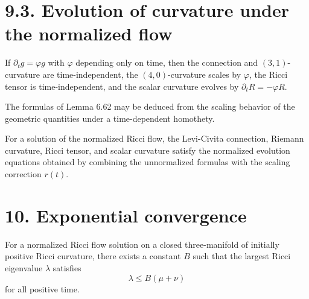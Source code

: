 \section*{9.3. Evolution of curvature under the normalized flow}

\begin{lemma}
\label{ch06-lem-pure-scaling-evolution}
If \(\partial_t g=\varphi g\) with \(\varphi\) depending only on time, then the connection and \((3,1)\)-curvature are time-independent, the \((4,0)\)-curvature scales by \(\varphi\), the Ricci tensor is time-independent, and the scalar curvature evolves by \(\partial_t R=-\varphi R\).
\end{lemma}

\begin{remark}
\label{ch06-rem-scaling-interpretation}
The formulas of Lemma 6.62 may be deduced from the scaling behavior of the geometric quantities under a time-dependent homothety.
\end{remark}

\begin{corollary}
\label{ch06-cor-curvature-evolution-normalized-flow}
For a solution of the normalized Ricci flow, the Levi-Civita connection, Riemann curvature, Ricci tensor, and scalar curvature satisfy the normalized evolution equations obtained by combining the unnormalized formulas with the scaling correction \(r(t)\).
\end{corollary}

\section*{10. Exponential convergence}

\begin{lemma}
\label{ch06-lem-pinching-ricci-eigenvalues}
For a normalized Ricci flow solution on a closed three-manifold of initially positive Ricci curvature, there exists a constant \(B\) such that the largest Ricci eigenvalue \(\lambda\) satisfies
\[
\lambda\le B(\mu+\nu)
\]
for all positive time.
\end{lemma}


